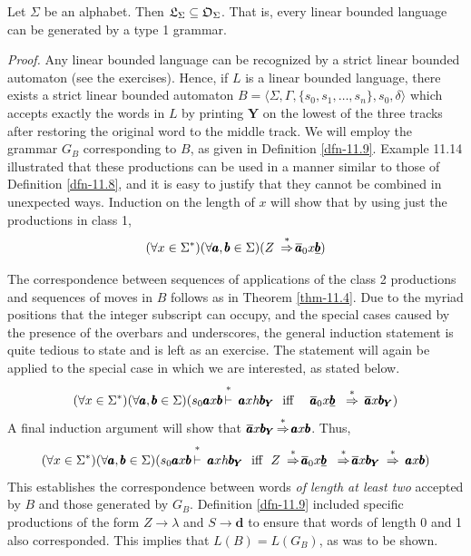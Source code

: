 \begin{thm}\label{thm-11.5}
Let $\Sigma$ be an alphabet. Then $\mathfrak{L}_\Sigma\subseteq\mathfrak{O}_\Sigma$. That is, every linear
bounded language can be generated by a type 1 grammar.

\emph{Proof.} Any linear bounded language can be recognized by a strict linear
bounded automaton (see the exercises). Hence, if $L$ is a linear bounded
language, there exists a strict linear bounded automaton $B=\langle\Sigma,
\Gamma,\{s_0,s_1,\ldots,s_n\},s_0,\delta\rangle$ which accepts exactly the words
in $L$ by printing $\pmb{Y}$ on the lowest of the three tracks after restoring
the original word to the middle track. We will employ the grammar $G_B$
corresponding to $B$, as given in Definition \ref{dfn-11.9}. Example 11.14 illustrated
that these productions can be used in a manner similar to those of Definition
\ref{dfn-11.8}, and it is easy to justify that they cannot be combined in unexpected ways.
Induction on the length of $x$ will show that by using just the productions in
class 1,
\[ (\forall x\in\Sigma^*)(\forall\pmb{a},\pmb{b}\in\Sigma)(Z\ \operatorname{\overset{*}{\Rightarrow}}
	\overline{\pmb{a}}_0x\underline{\pmb{b}}) \]

The correspondence between sequences of applications of the class 2 productions
and sequences of moves in $B$ follows as in Theorem \ref{thm-11.4}. Due to the myriad
positions that the integer subscript can occupy, and the special cases caused
by the presence of the overbars and underscores, the general induction statement
is quite tedious to state and is left as an exercise. The statement will again
be applied to the special case in which we are interested, as stated below.
\[ (\forall x\in\Sigma^*)(\forall\pmb{a},\pmb{b}\in\Sigma)(s_0\pmb{a}x\pmb{b}
	\Dvdash\pmb{a}xh\pmb{b_Y}\text{\ \ iff\ \ \ \ }\overline{\pmb{a}}_0x
	\underline{\pmb{b}}\ \ \DRightarrow\ \overline{\pmb{a}}x\pmb{b_Y}) \]
A final induction argument will show that $\overline{\pmb{a}}x\pmb{b_Y}
\operatorname{\overset{*}{\Rightarrow}}\pmb{a}x\pmb{b}$. Thus,
\[ (\forall x\in\Sigma^*)(\forall\pmb{a},\pmb{b}\in\Sigma)(s_0\pmb{a}x\pmb{b}
	\Dvdash\pmb{a}xh\pmb{b_Y}\text{\ \ iff\ \ } Z\ \DRightarrow
	\overline{\pmb{a}}_0x\underline{\pmb{b}}\ \ \DRightarrow\overline{\pmb{a}}x
	\pmb{b_Y}\ \DRightarrow\ \pmb{a}x\pmb{b}) \]
This establishes the correspondence between words \emph{of length at least two}
accepted by $B$ and those generated by $G_B$. Definition \ref{dfn-11.9} included specific
productions of the form $Z\rightarrow\lambda$ and $S\rightarrow\pmb{d}$ to
ensure that words of length 0 and 1 also corresponded. This implies that $L(B)=
L(G_B)$, as was to be shown.
\end{thm}

